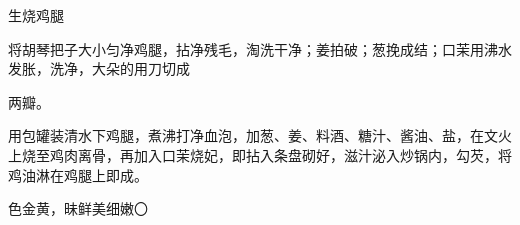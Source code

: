 \begin{recipe}{生烧鸡腿}

\ingredients


\cooking

\step 将胡琴把子大小匀净鸡腿，拈净残毛，淘洗干净；姜拍破；葱挽成结；口茉用沸水发胀，洗净，大朵的用刀切成

两瓣。

\step 用包罐装清水下鸡腿，煮沸打净血泡，加葱、姜、料酒、糖汁、酱油、盐，在文火上烧至鸡肉离骨，再加入口茉烧妃，即拈入条盘砌好，滋汁泌入炒锅内，勾芡，将鸡油淋在鸡腿上即成。

\notes

色金黄，昧鲜美细嫩〇

\end{recipe}

